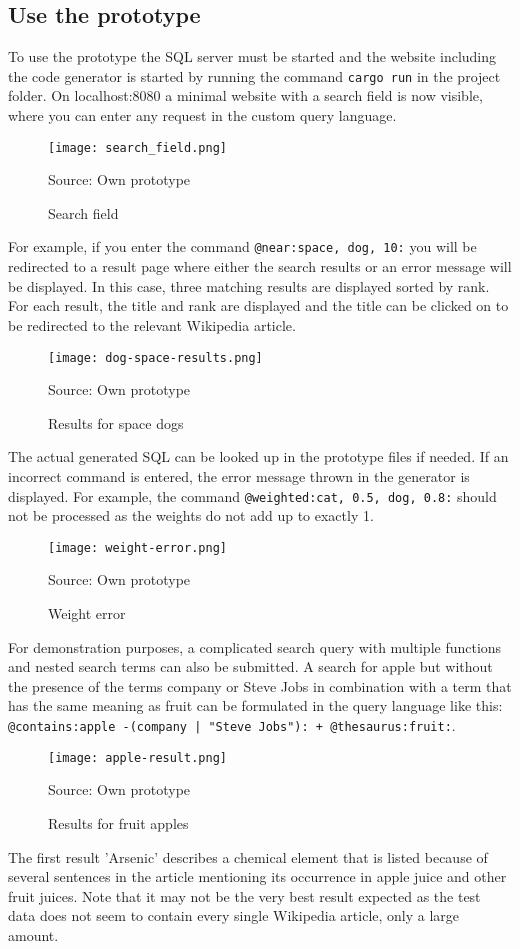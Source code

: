 \subsection{Use the prototype}
To use the prototype the \ac{SQL} server must be started and the website including the code generator is started by running the command \lstinline$cargo run$ in the project folder. On localhost:8080 a minimal website with a search field is now visible, where you can enter any request in the custom query language.
\begin{figure}[H]
    \caption{Search field}
    \label{fig:search}
    \texttt{[image: search\_field.png]}
    \\
    \centerline{Source: Own prototype}
\end{figure}
For example, if you enter the command \lstinline[language=Fulltext-Search]$@near:space, dog, 10:$ you will be redirected to a result page where either the search results or an error message will be displayed. In this case, three matching results are displayed sorted by rank. For each result, the title and rank are displayed and the title can be clicked on to be redirected to the relevant Wikipedia article.
\begin{figure}[H]
    \caption{Results for space dogs}
    \label{fig:space-dog}
    \texttt{[image: dog-space-results.png]}
    \\
    \centerline{Source: Own prototype}
\end{figure}
The actual generated \ac{SQL} can be looked up in the prototype files if needed. If an incorrect command is entered, the error message thrown in the generator is displayed. For example, the command \lstinline[language=Fulltext-Search]$@weighted:cat, 0.5, dog, 0.8:$ should not be processed as the weights do not add up to exactly 1.
\begin{figure}[H]
    \caption{Weight error}
    \label{fig:weight-error}
    \texttt{[image: weight-error.png]}
    \\
    \centerline{Source: Own prototype}
\end{figure}
For demonstration purposes, a complicated search query with multiple functions and nested search terms can also be submitted. A search for apple but without the presence of the terms company or Steve Jobs in combination with a term that has the same meaning as fruit can be formulated in the query language like this: \lstinline[language=Fulltext-Search]$@contains:apple -(company | "Steve Jobs"): + @thesaurus:fruit:$.
\begin{figure}[H]
    \caption{Results for fruit apples}
    \label{fig:apple-fruit}
    \texttt{[image: apple-result.png]}
    \\
    \centerline{Source: Own prototype}
\end{figure}
The first result 'Arsenic' describes a chemical element that is listed because of several sentences in the article mentioning its occurrence in apple juice and other fruit juices. Note that it may not be the very best result expected as the test data does not seem to contain every single Wikipedia article, only a large amount.
